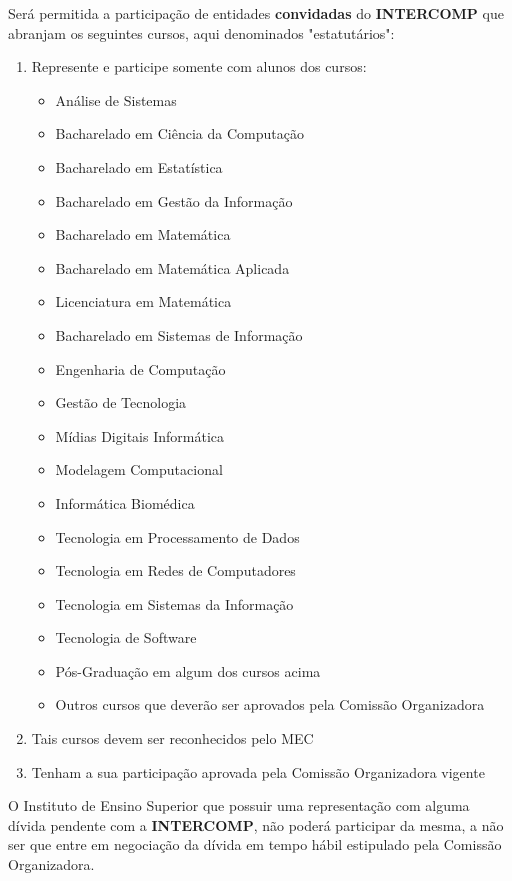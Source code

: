 \begin{article}
	\begin{xparagraph}
		Será permitida a participação de entidades \textbf{convidadas} do \textbf{INTERCOMP} que abranjam os seguintes cursos, aqui denominados "estatutários":
		\begin{enumerate}[noitemsep,leftmargin=2\parindent]
			\item Represente e participe somente com alunos dos cursos:
			\begin{itemize}[noitemsep]
				\item Análise de Sistemas
				\item Bacharelado em Ciência da Computação
				\item Bacharelado em Estatística
				\item Bacharelado em Gestão da Informação
				\item Bacharelado em Matemática
				\item Bacharelado em Matemática Aplicada
				\item Licenciatura em Matemática
				\item Bacharelado em Sistemas de Informação
				\item Engenharia de Computação
				\item Gestão de Tecnologia
				\item Mídias Digitais Informática
				\item Modelagem Computacional
				\item Informática Biomédica
				\item Tecnologia em Processamento de Dados
				\item Tecnologia em Redes de Computadores
				\item Tecnologia em Sistemas da Informação
				\item Tecnologia de Software
				\item Pós-Graduação em algum dos cursos acima
				\item Outros cursos que deverão ser aprovados pela Comissão Organizadora
			\end{itemize}

			\item Tais cursos devem ser reconhecidos pelo MEC
			\item Tenham a sua participação aprovada pela Comissão Organizadora vigente
		\end{enumerate}
	\end{xparagraph}

	\begin{xparagraph}
		O Instituto de Ensino Superior que possuir uma representação com alguma dívida pendente com a \textbf{INTERCOMP}, não poderá participar da mesma, a não ser que entre em negociação da dívida em tempo hábil estipulado pela Comissão Organizadora.
	\end{xparagraph}


\end{article}
